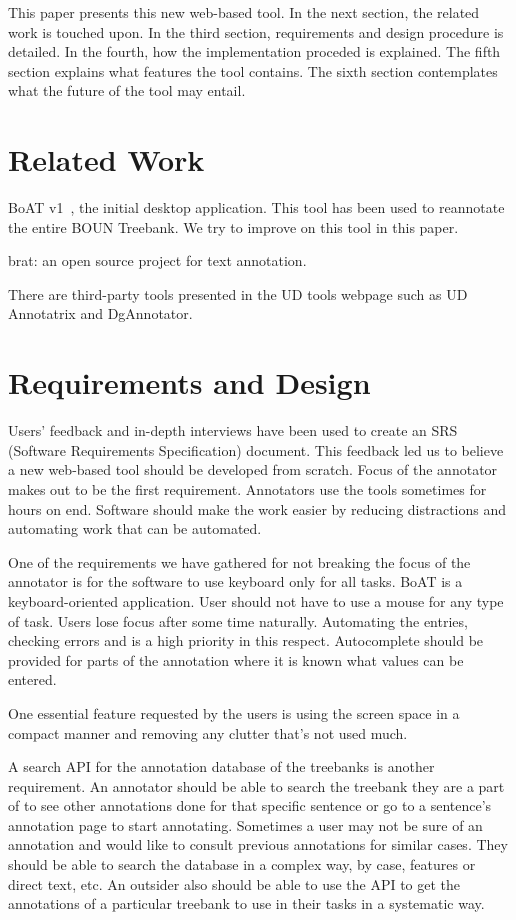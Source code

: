 \documentclass[
]{ceurart}
\begin{document}
This paper presents this new web-based tool.
In the next section, the related work is touched upon.
In the third section, requirements and design procedure is detailed.
In the fourth, how the implementation proceded is explained.
The fifth section explains what features the tool contains.
The sixth section contemplates what the future of the tool may entail.

\section{Related Work}

BoAT v1~\cite{turk-etal-2019-turkish}, the initial desktop application. 
This tool has been used to reannotate the entire BOUN Treebank.
We try to improve on this tool in this paper.

brat: an open source project for text annotation.\cite{brat}

There are third-party tools presented in the UD tools webpage such as UD Annotatrix\cite{tyers-etal:2018} and DgAnnotator\cite{dgannotator}.

\section{Requirements and Design}

Users' feedback and in-depth interviews have been used to create an SRS (Software Requirements Specification) document.
This feedback led us to believe a new web-based tool should be developed from scratch.
Focus of the annotator makes out to be the first requirement.
Annotators use the tools sometimes for hours on end.
Software should make the work easier by reducing distractions and automating work that can be automated.

One of the requirements we have gathered for not breaking the focus of the annotator is for the software to use keyboard only for all tasks.
BoAT is a keyboard-oriented application.
User should not have to use a mouse for any type of task.
Users lose focus after some time naturally.
Automating the entries, checking errors and is a high priority in this respect.
Autocomplete should be provided for parts of the annotation where it is known what values can be entered.

One essential feature requested by the users is using the screen space in a compact manner and removing any clutter that's not used much.


A search API for the annotation database of the treebanks is another requirement.
An annotator should be able to search the treebank they are a part of to see other annotations done for that specific sentence or go to a sentence's annotation page to start annotating.
Sometimes a user may not be sure of an annotation and would like to consult previous annotations for similar cases.
They should be able to search the database in a complex way, by case, features or direct text, etc.
An outsider also should be able to use the API to get the annotations of a particular treebank to use in their tasks in a systematic way.
\end{document}
